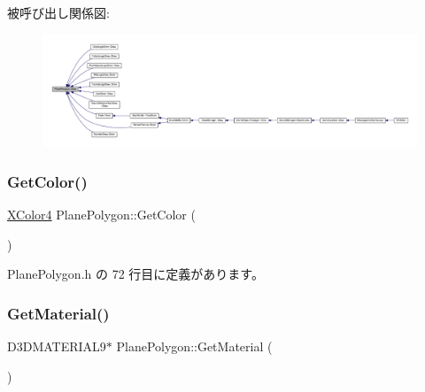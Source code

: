 被呼び出し関係図\+:
\nopagebreak
\begin{figure}[H]
\begin{center}
\leavevmode
\includegraphics[width=350pt]{class_plane_polygon_a2f20691ee0feee4fa428f5d017d7062a_icgraph}
\end{center}
\end{figure}
\mbox{\label{class_plane_polygon_ac4f8f7b51acdb744231efd342d3b2734}} 
\subsubsection{\texorpdfstring{Get\+Color()}{GetColor()}}
{\footnotesize\ttfamily \mbox{\hyperlink{_vector3_d_8h_a680c30c4a07d86fe763c7e01169cd6cc}{X\+Color4}} Plane\+Polygon\+::\+Get\+Color (\begin{DoxyParamCaption}{ }\end{DoxyParamCaption})\hspace{0.3cm}{\ttfamily [inline]}}



 Plane\+Polygon.\+h の 72 行目に定義があります。

\mbox{\label{class_plane_polygon_a808087c9d82c0eb7cfb0709c9906e833}} 
\subsubsection{\texorpdfstring{Get\+Material()}{GetMaterial()}}
{\footnotesize\ttfamily D3\+D\+M\+A\+T\+E\+R\+I\+A\+L9$\ast$ Plane\+Polygon\+::\+Get\+Material (\begin{DoxyParamCaption}{ }\end{DoxyParamCaption})\hspace{0.3cm}{\ttfamily [inline]}}



